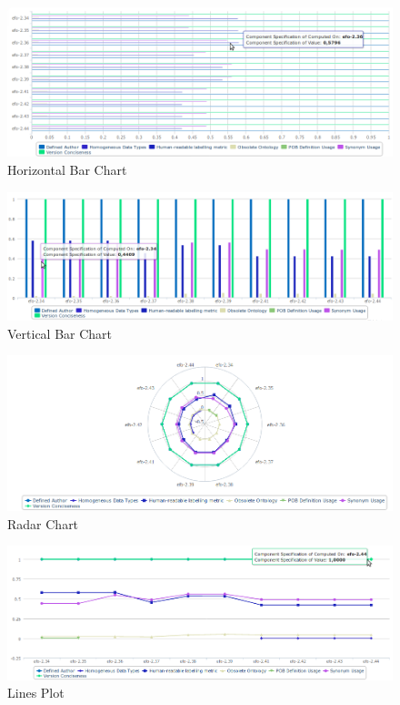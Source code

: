 \begin{figure}[tbph]
\center
  \includegraphics[scale=0.4]{images/cube_1.png}
\caption{Horizontal Bar Chart} 
  \label{fig:hor_chart}
\end{figure}

\begin{figure}[tbph]
\center
\includegraphics[scale=0.4]{images/cube_2.png} 
\caption{Vertical Bar Chart} 
\label{fig:ver_chart}
\end{figure}

\begin{figure}[tbph]
\center
\includegraphics[scale=0.4]{images/cube_3.png} 
\caption{Radar Chart} 
\label{fig:rad_chart}
\end{figure}

\begin{figure}[tbph]
\center
\includegraphics[scale=0.4]{images/cube_4.png} 
\caption{Lines Plot} 
\label{fig:line_chart}
\end{figure}

